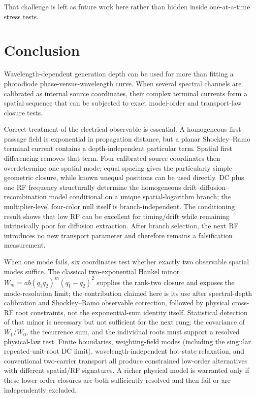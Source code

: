 \documentclass[11pt]{article}
\begin{document}
That challenge is left as future work here rather than hidden inside one-at-a-time stress tests.

\section{Conclusion}

Wavelength-dependent generation depth can be used for more than fitting a photodiode phase-versus-wavelength curve. When several spectral channels are calibrated as internal source coordinates, their complex terminal currents form a spatial sequence that can be subjected to exact model-order and transport-law closure tests.

Correct treatment of the electrical observable is essential. A homogeneous first-passage field is exponential in propagation distance, but a planar Shockley--Ramo terminal current contains a depth-independent particular term. Spatial first differencing removes that term. Four calibrated source coordinates then overdetermine one spatial mode; equal spacing gives the particularly simple geometric closure, while known unequal positions can be used directly. DC plus one RF frequency structurally determine the homogeneous drift--diffusion--recombination model conditional on a unique spatial-logarithm branch; the multiplier-level four-color null itself is branch-independent. The conditioning result shows that low RF can be excellent for timing/drift while remaining intrinsically poor for diffusion extraction. After branch selection, the next RF introduces no new transport parameter and therefore remains a falsification measurement.

When one mode fails, six coordinates test whether exactly two observable spatial modes suffice. The classical two-exponential Hankel minor $W_m=ab(q_1q_2)^m(q_1-q_2)^2$ supplies the rank-two closure and exposes the mode-resolution limit; the contribution claimed here is its use after spectral-depth calibration and Shockley--Ramo observable correction, followed by physical cross-RF root constraints, not the exponential-sum identity itself. Statistical detection of that minor is necessary but not sufficient for the next rung: the covariance of $W_1/W_0$, the recurrence sum, and the individual roots must support a resolved physical-law test. Finite boundaries, weighting-field modes (including the singular repeated-unit-root DC limit), wavelength-independent hot-state relaxation, and conventional two-carrier transport all produce constrained low-order alternatives with different spatial/RF signatures. A richer physical model is warranted only if these lower-order closures are both sufficiently resolved and then fail or are independently excluded.
\end{document}
